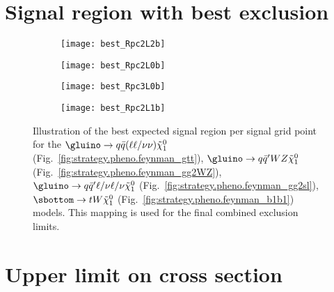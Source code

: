 \section{Signal region with best exclusion}
\label{app:aux.bestSR}

\begin{figure}[htb!]
\centering
\begin{subfigure}[t]{0.49\textwidth}\texttt{[image: best\_Rpc2L2b]}\caption{}\label{fig:best_Rpc2L2b}\end{subfigure}
\begin{subfigure}[t]{0.49\textwidth}\texttt{[image: best\_Rpc2L0b]}\caption{}\label{fig:best_Rpc2L0b}\end{subfigure}
\begin{subfigure}[t]{0.49\textwidth}\texttt{[image: best\_Rpc3L0b]}\caption{}\label{fig:best_Rpc3L0b}\end{subfigure}
\begin{subfigure}[t]{0.49\textwidth}\texttt{[image: best\_Rpc2L1b]}\caption{}\label{fig:best_Rpc2L1b}\end{subfigure}
\caption{Illustration of the best expected signal region per signal grid point for the 
$\gluino\to q\bar q (\ell\ell/\nu\nu)\tilde\chi^0_1$ (Fig.~\ref{fig:strategy.pheno.feynman_gtt}), $\gluino\to q\bar q' WZ\tilde\chi^0_1$ (Fig.~\ref{fig:strategy.pheno.feynman_gg2WZ}),
$\gluino\to q\bar q' \ell/\nu \ell/\nu \tilde\chi^0_1$ (Fig.~\ref{fig:strategy.pheno.feynman_gg2sl}), $\sbottom\to t W \tilde\chi^0_1$ (Fig.~\ref{fig:strategy.pheno.feynman_b1b1}) models. 
This mapping is used for the final combined exclusion limits.}
\label{fig:best_SR}
\end{figure}


\clearpage

\section{Upper limit on cross section}
\label{app:aux.ULcs}


